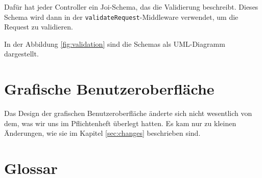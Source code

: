 \documentclass{implementierungsheft}
\begin{document}
Dafür hat jeder Controller ein Joi-Schema, das die Validierung beschreibt. Dieses Schema wird dann in der \texttt{validateRequest}-Middleware verwendet, um die Request zu validieren.

In der Abbildung \ref{fig:validation} sind die Schemas als UML-Diagramm dargestellt.



\section{Grafische Benutzeroberfläche}
Das Design der grafischen Benutzeroberfläche änderte sich nicht wesentlich von dem, was wir uns im Pflichtenheft überlegt hatten.
Es kam nur zu kleinen Änderungen, wie sie im Kapitel \ref{sec:changes} beschrieben sind.
\newpage
\section{Glossar}
\printglossary[style=altlist]
\end{document}
